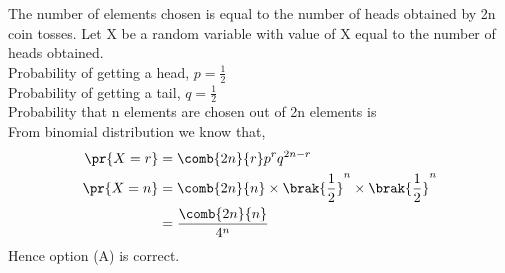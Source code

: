The number of elements chosen is equal to the number of heads obtained by 2n coin tosses.
Let X be a random variable with value of X equal to the number of heads obtained.\\
Probability of getting a head, $p=\frac{1}{2}$\\
Probability of getting a tail, $q=\frac{1}{2}$\\
Probability that n elements are chosen out of 2n elements is \\
From binomial distribution we know that,
\begin{align}
\pr{X=r}&=\comb{2n}{r}p^{r}q^{2n-r}\\
\pr{X=n}&=\comb{2n}{n} \times \brak{\frac{1}{2}}^{n}  \times \brak{\frac{1}{2}}^{n}\\
        &=\frac{\comb{2n}{n}}{4^{n}}
\end{align}
Hence option (A) is correct.